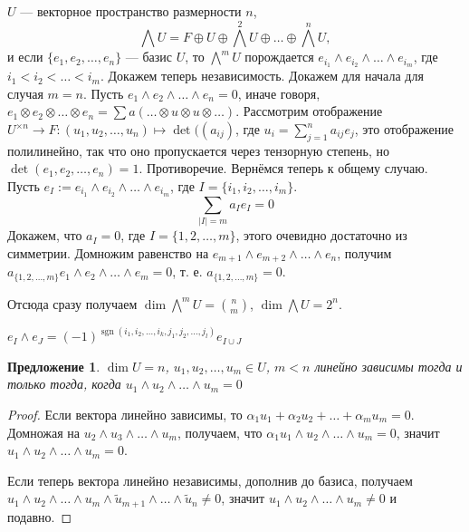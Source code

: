 \documentclass{article}
\newtheorem*{proposition}{Предложение}
\theoremstyle{definition}
\theoremstyle{remark}
\DeclareMathOperator{\sgn}{sgn}
\begin{document}
$U$ --- векторное пространство размерности $n$,
$$\bigwedge U = F \oplus U \oplus \bigwedge^2 U \oplus \ldots \oplus \bigwedge^n U,$$
и если $\{e_1, e_2, \ldots, e_n\}$ --- базис $U$, то $\bigwedge^m U$ порождается $e_{i_1} \wedge e_{i_2} \wedge \ldots \wedge e_{i_m}$, где $i_1 < i_2 < \ldots < i_m$. Докажем теперь независимость. Докажем для начала для случая $m = n$. Пусть $e_1 \wedge e_2 \wedge \ldots \wedge e_n = 0$, иначе говоря, $e_1 \otimes e_2 \otimes \ldots \otimes e_n = \sum a(\ldots \otimes u \otimes u \otimes \ldots)$. Рассмотрим отображение $U^{\times n} \rightarrow F: (u_1, u_2, \ldots, u_n) \mapsto \det((a_{ij})$, где $u_i = \sum_{j = 1}^n a_{ij}e_j$, это отображение полилинейно, так что оно пропускается через тензорную степень, но $\det(e_1, e_2, \ldots, e_n) = 1$. Противоречие. Вернёмся теперь к общему случаю. Пусть $e_I := e_{i_1} \wedge e_{i_2} \wedge \ldots \wedge e_{i_m}$, где $I = \{i_1, i_2, \ldots, i_m\}$. 
$$\sum_{|I| = m} a_I e_I = 0$$
Докажем, что $a_I = 0$, где $I = \{1, 2, \ldots, m\}$, этого очевидно достаточно из симметрии.
Домножим равенство на $e_{m + 1} \wedge e_{m + 2} \wedge \ldots \wedge e_n$, получим
$a_{\{1, 2, \ldots, m\}}e_1 \wedge e_2 \wedge \ldots \wedge e_m = 0$, т. е. $a_{\{1, 2, \ldots, m\}} = 0$.

Отсюда сразу получаем $\dim \bigwedge^m U = \binom{n}{m}$, $\dim \bigwedge U = 2^n$.	

$e_I \wedge e_J = (-1)^{\sgn(i_1, i_2, \ldots, i_k, j_1, j_2, \ldots, j_l)}e_{I \cup J}$

\begin{proposition}
$\dim U = n$, $u_1, u_2, \ldots, u_m \in U$, $m < n$ линейно зависимы тогда и только тогда, когда $u_1 \wedge u_2 \wedge \ldots \wedge u_m = 0$
\end{proposition}
\begin{proof}
Если вектора линейно зависимы, то $\alpha_1 u_1 + \alpha_2 u_2 + \ldots + \alpha_m u_m = 0$. Домножая на $u_2 \wedge u_3 \wedge \ldots \wedge u_m$, получаем, что $\alpha_1 u_1 \wedge u_2 \wedge \ldots \wedge u_m = 0$, значит $u_1 \wedge u_2 \wedge \ldots \wedge u_m = 0$.
	
Если теперь вектора линейно независимы, дополнив до базиса, получаем $u_1 \wedge u_2 \wedge \ldots \wedge u_m \wedge \tilde{u}_{m + 1} \wedge \ldots \wedge \tilde{u}_n \neq 0$, значит $u_1 \wedge u_2 \wedge \ldots \wedge u_m \neq 0$ и подавно.
\end{proof}
\end{document}
